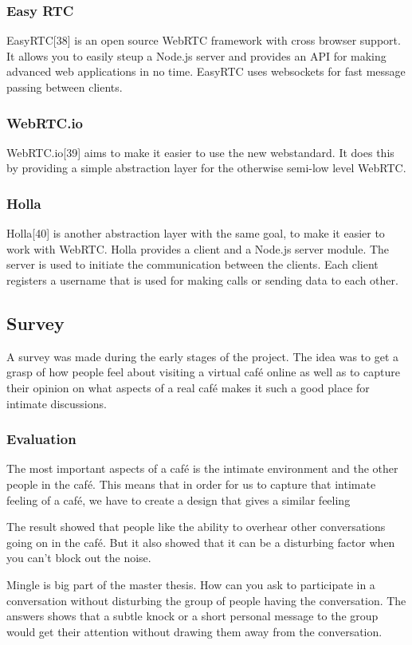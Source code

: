 \documentclass[12pt, titlepage]{article}
\begin{document}
\subsubsection{Easy RTC}
EasyRTC[38] is an open source WebRTC framework with cross browser support. It allows you to easily steup a Node.js server and provides an API for making advanced web applications in no time. EasyRTC uses websockets for fast message passing between clients.
\subsubsection{WebRTC.io}
WebRTC.io[39] aims to make it easier to use the new webstandard. It does this by providing a simple abstraction layer for the otherwise semi-low level WebRTC.
\subsubsection{Holla}
Holla[40] is another abstraction layer with the same goal, to make it easier to work with WebRTC. Holla provides a client and a Node.js server module. The server is used to initiate the communication between the clients. Each client registers a username that is used for making calls or sending data to each other.
\subsection{Survey}
A survey was made during the early stages of the project. The idea was to get a grasp of how people feel about visiting a virtual café online as well as to capture their opinion on what aspects of a real café makes it such a good place for intimate discussions.
\subsubsection{Evaluation}
The most important aspects of a café is the intimate environment and the other people in the café. This means that in order for us to capture that intimate feeling of a café, we have to create a design that gives a similar feeling

The result showed that people like the ability to overhear other conversations going on in the café. But it also showed that it can be a disturbing factor when you can't block out the noise.

Mingle is big part of the master thesis. How can you ask to participate in a conversation without disturbing the group of people having the conversation. The answers shows that a subtle knock or a short personal message to the group would get their attention without drawing them away from the conversation.
\end{document}
